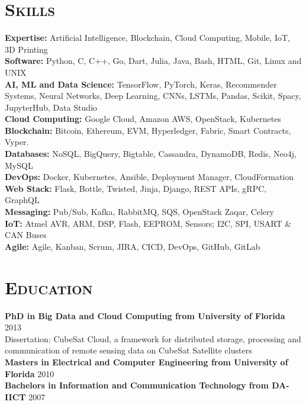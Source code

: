 \begin{resume}
\section{\textsc{Skills}}
{\bf Expertise:} Artificial Intelligence, Blockchain, Cloud Computing, Mobile, IoT, 3D Printing
\\ {\bf Software:} Python, C, C++, Go, Dart, Julia, Java, Bash, HTML, Git, Linux and UNIX
\\ {\bf AI, ML and Data Science:} TensorFlow, PyTorch, Keras, Recommender Systems, Neural Networks, Deep Learning, CNNs, LSTMs, Pandas, Scikit, Spacy, JupyterHub, Data Studio
\\ {\bf Cloud Computing:} Google Cloud, Amazon AWS, OpenStack, Kubernetes
\\ {\bf Blockchain:} Bitcoin, Ethereum, EVM, Hyperledger, Fabric, Smart Contracts, Vyper.
\\ {\bf Databases:} NoSQL, BigQuery, Bigtable, Cassandra, DynamoDB, Redis, Neo4j, MySQL
\\ {\bf DevOps:} Docker, Kubernetes, Ansible, Deployment Manager, CloudFormation
\\ {\bf Web Stack:} Flask, Bottle, Twisted, Jinja, Django, REST APIs, gRPC, GraphQL
\\ {\bf Messaging:} Pub/Sub, Kafka, RabbitMQ, SQS, OpenStack Zaqar, Celery
\\ {\bf IoT:} Atmel AVR, ARM, DSP, Flash, EEPROM, Sensors; I2C, SPI, USART \& CAN Buses
\\ {\bf Agile:} Agile, Kanban, Scrum, JIRA, CICD, DevOps, GitHub, GitLab


\section{\textsc{Education}}
\textbf{PhD in Big Data and Cloud Computing from University of Florida} \hfill 2013 \\
Dissertation: CubeSat Cloud, a framework for distributed storage, processing and communication of remote sensing data on CubeSat Satellite clusters\\
\textbf{Masters in Electrical and Computer Engineering from University of Florida} \hfill 2010 \\
\textbf{Bachelors in Information and Communication Technology from DA-IICT} \hfill 2007

\begin{formatb}
  \\
  \body\\
\end{formatb}


\end{resume}
